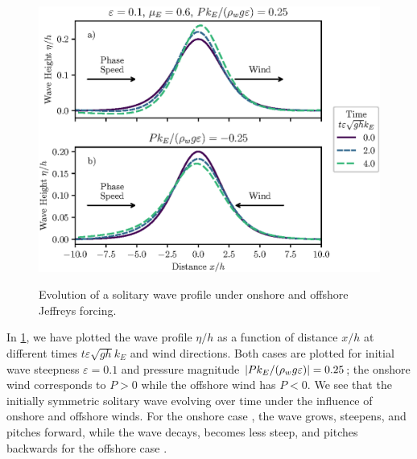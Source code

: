\documentclass{jfm}
\renewcommand*{\epsilon}{\varepsilon}
\begin{document}
\begin{figure}
  \centering
  { %
    \label{fig:snapshots_solitary:a}
    \label{fig:snapshots_solitary:b}
  }
  \includegraphics{Snapshots-Positive-Negative.eps}
  \caption{
    Evolution of a solitary wave profile under
    onshore and
    offshore Jeffreys forcing.
  }
  \label{fig:snapshots_solitary}
\end{figure}

In \cref{fig:snapshots_solitary}, we have plotted the wave profile
$\eta/h$ as a function of distance $x/h$ at different times $t \epsilon
\sqrt{g h} k_E$ and wind directions.
Both cases are plotted for initial wave steepness $\epsilon = 0.1$ and
pressure magnitude $\abs{P k_E/(\rho_w g \epsilon)} = 0.25$; the onshore
wind  corresponds to $P>0$ while the
offshore wind  has $P<0$.
We see that the initially symmetric solitary wave evolving over time
under the influence of  onshore and
 offshore winds.
For the onshore case , the wave grows,
steepens, and pitches forward, while the wave decays, becomes less
steep, and pitches backwards for the offshore case
.
\end{document}
